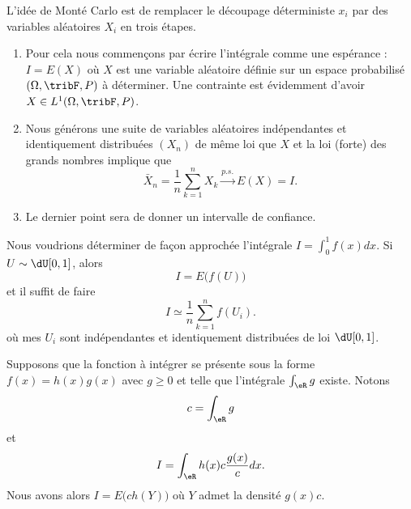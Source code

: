 L'idée de Monté Carlo est de remplacer le découpage déterministe \( x_i\) par des variables aléatoires \( X_i\) en trois étapes.

\begin{enumerate}
	\item
	      Pour cela nous commençons par écrire l'intégrale comme une espérance : \( I=E(X)\) où \( X\) est une variable aléatoire définie sur un espace probabilisé \( (\Omega,\tribF,P)\) à déterminer. Une contrainte est évidemment d'avoir \( X\in L^1(\Omega,\tribF,P)\).

	\item
	      Nous générons une suite de variables aléatoires indépendantes et identiquement distribuées \( (X_n)\) de même loi que \( X\) et la loi (forte) des grands nombres implique que
	      \begin{equation}
		      \bar X_n=\frac{1}{ n }\sum_{k=1}^nX_k\stackrel{p.s.}{\longrightarrow} E(X)=I.
	      \end{equation}

	\item
	      Le dernier point sera de donner un intervalle de confiance.
\end{enumerate}

\begin{example}     \label{ExempleIintfdxEXu}
	Nous voudrions déterminer de façon approchée l'intégrale \( I=\int_0^1 f(x)dx\). Si \( U\sim\dU\mathopen[ 0 , 1 \mathclose]\), alors
	\begin{equation}
		I=E\big( f(U) \big)
	\end{equation}
	et il suffit de faire
	\begin{equation}
		I\simeq\frac{1}{ n }\sum_{k=1}^nf(U_i).
	\end{equation}
	où mes \( U_i\) sont indépendantes et identiquement distribuées de loi \( \dU\mathopen[ 0 , 1 \mathclose]\).
\end{example}

\begin{example}
	Supposons que la fonction à intégrer se présente sous la forme \( f(x)=h(x)g(x)\) avec \( g\geq 0\) et telle que l'intégrale \( \int_{\eR}g\) existe. Notons
	\begin{equation}
		c=\int_{\eR}g
	\end{equation}
	et
	\begin{equation}
		I=\int_{\eR}h(x)c\frac{ g(x) }{ c }dx.
	\end{equation}
	Nous avons alors \( I=E\big( ch(Y) \big)\) où \( Y\) admet la densité \( g(x)c\).
\end{example}

